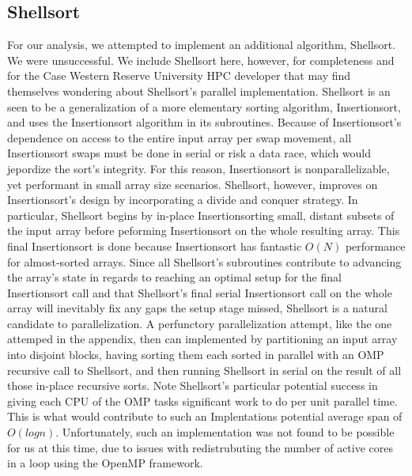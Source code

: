 \documentclass[conference]{IEEEtran}
\begin{document}
    
    
    \subsection{Shellsort}
    
    For our analysis, we attempted to implement an additional algorithm, Shellsort. We were unsuccessful. We include Shellsort here, however, for completeness and for the Case Western Reserve University HPC developer that may find themselves wondering about Shellsort's parallel implementation. Shellsort is an seen to be a generalization of a more elementary sorting algorithm, Insertionsort, and uses the Insertionsort algorithm in its subroutines. Because of Insertionsort's dependence on access to the entire input array per swap movement, all Insertionsort swaps must be done in serial or risk a data race, which would jepordize the sort's integrity. For this reason, Insertionsort is nonparallelizable, yet performant in small array size scenarios. Shellsort, however, improves on Insertionsort's design by incorporating a divide and conquer strategy. In particular, Shellsort begins by in-place Insertionsorting small, distant subsets of the input array before peforming Insertionsort on the whole resulting array. This final Insertionsort is done because Insertionsort has fantastic $O(N)$ performance for almost-sorted arrays.  Since all Shellsort's subroutines contribute to advancing the array's state in regards to reaching an optimal setup for the final Insertionsort call and that Shellsort's final serial Insertionsort call on the whole array will inevitably fix any gaps the setup stage missed, Shellsort is a natural candidate to parallelization. A perfunctory parallelization attempt, like the one attemped in the appendix, then can implemented by partitioning an input array into disjoint blocks, having sorting them each sorted in parallel with an OMP recursive call to Shellsort, and then running Shellsort in serial on the result of all those in-place recursive sorts. Note Shellsort's particular potential success in giving each CPU of the OMP tasks significant work to do per unit parallel time. This is what would contribute to such an Implentations potential average span of $O(logn)$. Unfortunately, such an implementation was not found to be possible for us at this time, due to issues with redistrubuting the number of active cores in a loop using the OpenMP framework.  
    
\end{document}
